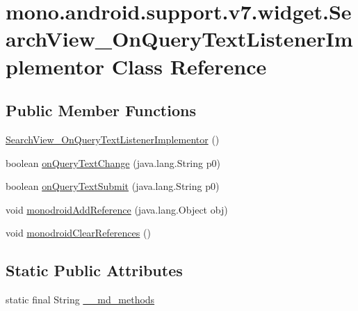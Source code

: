 \hypertarget{classmono_1_1android_1_1support_1_1v7_1_1widget_1_1_search_view___on_query_text_listener_implementor}{
\section{mono.android.support.v7.widget.SearchView\_\-OnQueryTextListenerImplementor Class Reference}
\label{classmono_1_1android_1_1support_1_1v7_1_1widget_1_1_search_view___on_query_text_listener_implementor}
}
\subsection*{Public Member Functions}
\begin{CompactItemize}
\item 
\hyperlink{classmono_1_1android_1_1support_1_1v7_1_1widget_1_1_search_view___on_query_text_listener_implementor_a4014fa9fb29bb2c949ebba80bff00de}{SearchView\_\-OnQueryTextListenerImplementor} ()
\item 
boolean \hyperlink{classmono_1_1android_1_1support_1_1v7_1_1widget_1_1_search_view___on_query_text_listener_implementor_37164a1e4575c60d88089e3d3ae36c55}{onQueryTextChange} (java.lang.String p0)
\item 
boolean \hyperlink{classmono_1_1android_1_1support_1_1v7_1_1widget_1_1_search_view___on_query_text_listener_implementor_b4143af34811f748cd0c6cfcda75237a}{onQueryTextSubmit} (java.lang.String p0)
\item 
void \hyperlink{classmono_1_1android_1_1support_1_1v7_1_1widget_1_1_search_view___on_query_text_listener_implementor_a5801bb2e02637a33a8f7dd14016f759}{monodroidAddReference} (java.lang.Object obj)
\item 
void \hyperlink{classmono_1_1android_1_1support_1_1v7_1_1widget_1_1_search_view___on_query_text_listener_implementor_c9620633edcb7b40810131b0604bb68d}{monodroidClearReferences} ()
\end{CompactItemize}
\subsection*{Static Public Attributes}
\begin{CompactItemize}
\item 
static final String \hyperlink{classmono_1_1android_1_1support_1_1v7_1_1widget_1_1_search_view___on_query_text_listener_implementor_e251e6ade13e5dd277fac9fdfb2113ff}{\_\-\_\-md\_\-methods}
\end{CompactItemize}
